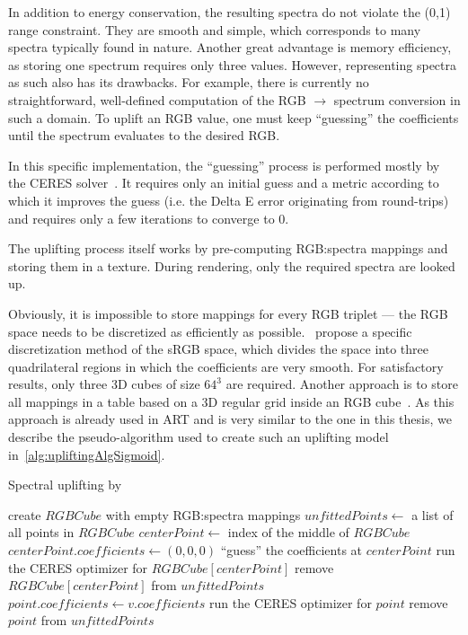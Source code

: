 In addition to energy conservation, the resulting spectra do not violate the (0,1) range constraint. They are smooth and simple, which corresponds to many spectra typically found in nature. Another great advantage is memory efficiency, as storing one spectrum requires only three values. However, representing spectra as such also has its drawbacks. For example, there is currently no straightforward, well-defined computation of the RGB $\to$ spectrum conversion in such a domain. To uplift an RGB value, one must keep ``guessing'' the coefficients until the spectrum evaluates to the desired RGB.

In this specific implementation, the ``guessing'' process is performed mostly by the CERES solver~\cite{ceres-solver}. It requires only an initial guess and a metric according to which it improves the guess (i.e. the Delta E error originating from round-trips) and requires only a few iterations to converge to 0.

The uplifting process itself works by pre-computing RGB:spectra mappings and storing them in a texture. During rendering, only the required spectra are looked up.

Obviously, it is impossible to store mappings for every RGB triplet --- the RGB space needs to be discretized as efficiently as possible.~\citet{upsamplingJakobHanika} propose a specific discretization method of the sRGB space, which divides the space into three quadrilateral regions in which the coefficients are very smooth. For satisfactory results, only three 3D cubes of size $64^3$ are required. Another approach is to store all mappings in a table based on a 3D regular grid inside an RGB cube~\cite{upsamplingFluorescence}. As this approach is already used in ART and is very similar to the one in this thesis, we describe the pseudo-algorithm used to create such an uplifting model in~\cref{alg:upliftingAlgSigmoid}.

\begin{algorithm}[t!]
	\caption{Spectral uplifting by~\citet{upsamplingJakobHanika}}
	\label{alg:upliftingAlgSigmoid}
	\begin{algorithmic}[1]
		\State create $RGBCube$ with empty RGB:spectra mappings
		\State $unfittedPoints \gets$ a list of all points in $RGBCube$
		\State $centerPoint \gets$ index of the middle of $RGBCube$
		\Statex {}
		\State $centerPoint.coefficients \gets (0,0,0)$
		\Statex \Comment ``guess'' the coefficients at $centerPoint$
		\State run the CERES optimizer for $RGBCube[centerPoint]$
		\State remove $RGBCube[centerPoint]$ from $unfittedPoints$
		\State $point.coefficients \gets v.coefficients$
		\State run the CERES optimizer for $point$
		\State remove $point$ from $unfittedPoints$
		\EndIf
		\EndIf
		\EndFor
		\EndWhile
	\end{algorithmic}
\end{algorithm}

